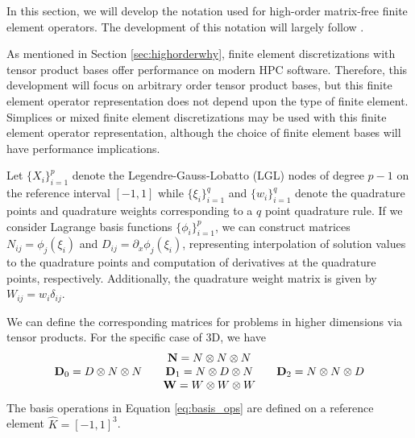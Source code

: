 In this section, we will develop the notation used for high-order matrix-free finite element operators.
The development of this notation will largely follow \cite{brown2010efficient}.

As mentioned in Section \ref{sec:highorderwhy}, finite element discretizations with tensor product bases offer performance on modern HPC software.
Therefore, this development will focus on arbitrary order tensor product bases, but this finite element operator representation does not depend upon the type of finite element.
Simplices or mixed finite element discretizations may be used with this finite element operator representation, although the choice of finite element bases will have performance implications.

Let $\lbrace X_i \rbrace_{i = 1}^p$ denote the Legendre-Gauss-Lobatto (LGL) nodes of degree $p - 1$ on the reference interval $\left[ -1, 1 \right]$ while $\lbrace \xi_i \rbrace_{i = 1}^q$ and $\lbrace w_i \rbrace_{i = 1}^q$ denote the quadrature points and quadrature weights corresponding to a $q$ point quadrature rule.
If we consider Lagrange basis functions $\lbrace \phi_i \rbrace_{i = 1}^p$, we can construct matrices $N_{i j} = \phi_j \left( \xi_i \right)$ and $D_{i j} = \partial_x \phi_j \left( \xi_i \right)$, representing interpolation of solution values to the quadrature points and computation of derivatives at the quadrature points, respectively.
Additionally, the quadrature weight matrix is given by $W_{i j} = w_i \delta_{i j}$.

We can define the corresponding matrices for problems in higher dimensions via tensor products.
For the specific case of 3D, we have
\begin{equation}
\begin{tabular}{c}
$\mathbf{N}   = N \otimes N \otimes N$ \\
$\mathbf{D}_0 = D \otimes N \otimes N$ \hspace{5mm}
$\mathbf{D}_1 = N \otimes D \otimes N$ \hspace{5mm}
$\mathbf{D}_2 = N \otimes N \otimes D$ \\
$\mathbf{W}   = W \otimes W \otimes W$
\end{tabular}
\label{eq:basis_ops}
\end{equation}
The basis operations in Equation \ref{eq:basis_ops} are defined on a reference element $\hat{K} = \left[ -1, 1 \right]^3$.

